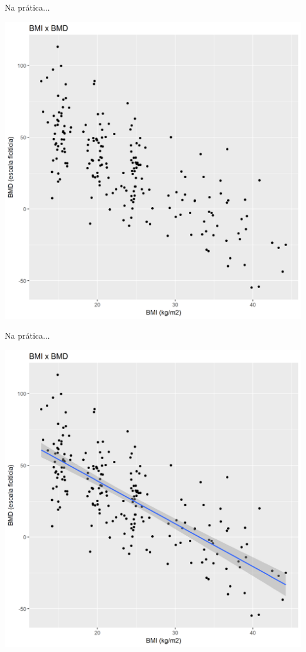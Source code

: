 \documentclass{beamer}
\begin{document}
\begin{frame}{Na prática...}
  \begin{center}
    \includegraphics[height=.9\textheight]{Cap18-19/pratica-plot1}
  \end{center}
\end{frame}

\begin{frame}{Na prática...}
  \begin{center}
    \includegraphics[height=.9\textheight]{Cap18-19/pratica-plot2}
  \end{center}
\end{frame}
\end{document}
